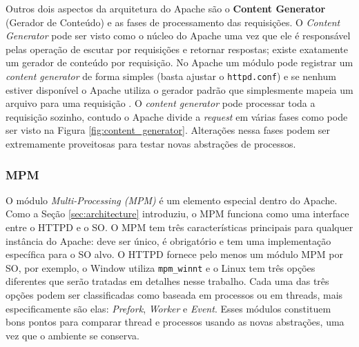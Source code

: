Outros dois aspectos da arquitetura do Apache são o \textbf{Content Generator}
(Gerador de Conteúdo) e as fases de processamento das requisições. O
\textit{Content Generator} pode ser visto como o núcleo do Apache uma vez que
ele é responsável pelas operação de escutar por requisições e retornar
respostas; existe exatamente um gerador de conteúdo por requisição. No Apache
um módulo pode registrar um \textit{content generator} de forma simples (basta
ajustar o \texttt{httpd.conf}) e se nenhum estiver disponível o Apache utiliza
o gerador padrão que simplesmente mapeia um arquivo para uma requisição
\citep{apache_module_book}. O \textit{content generator} pode processar toda a
requisição sozinho, contudo o Apache divide a \textit{request} em várias fases
como pode ser visto na Figura \ref{fig:content_generator}. Alterações nessa
fases podem ser extremamente proveitosas para testar novas abstrações de
processos.

\subsubsection{MPM}
\label{sec:prefork}

O módulo \textit{Multi-Processing (MPM)} é um elemento especial dentro do
Apache. Como a Seção \ref{sec:architecture} introduziu, o MPM funciona como uma
interface entre o HTTPD e o SO. O MPM tem três características principais para
qualquer instância do Apache: deve ser único, é obrigatório e tem uma
implementação específica para o SO alvo. O HTTPD fornece pelo menos um módulo
MPM por SO, por exemplo, o Window utiliza \texttt{mpm\_winnt} e o Linux tem
três opções diferentes que serão tratadas em detalhes nesse trabalho. Cada uma
das três opções podem ser classificadas como baseada em processos ou em
threads, mais especificamente são elas: \textit{Prefork}, \textit{Worker} e
\textit{Event}. Esses módulos constituem bons pontos para comparar thread e
processos usando as novas abstrações, uma vez que o ambiente se conserva.

